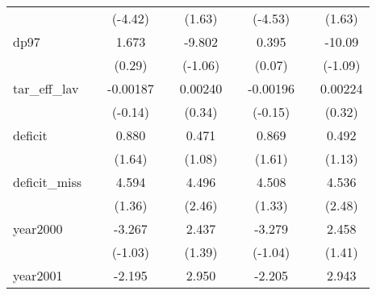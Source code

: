 {\begin{tabular}{l*{8}{c}}
            &                     &     (-4.42)         &                     &      (1.63)         &                     &     (-4.53)         &                     &      (1.63)         \\
[1em]
dp97        &                     &       1.673         &                     &      -9.802         &                     &       0.395         &                     &      -10.09         \\
            &                     &      (0.29)         &                     &     (-1.06)         &                     &      (0.07)         &                     &     (-1.09)         \\
[1em]
tar\_eff\_lav &                     &    -0.00187         &                     &     0.00240         &                     &    -0.00196         &                     &     0.00224         \\
            &                     &     (-0.14)         &                     &      (0.34)         &                     &     (-0.15)         &                     &      (0.32)         \\
[1em]
deficit     &                     &       0.880         &                     &       0.471         &                     &       0.869         &                     &       0.492         \\
            &                     &      (1.64)         &                     &      (1.08)         &                     &      (1.61)         &                     &      (1.13)         \\
[1em]
deficit\_miss&                     &       4.594         &                     &       4.496\sym{*}  &                     &       4.508         &                     &       4.536\sym{*}  \\
            &                     &      (1.36)         &                     &      (2.46)         &                     &      (1.33)         &                     &      (2.48)         \\
[1em]
year2000    &                     &      -3.267         &                     &       2.437         &                     &      -3.279         &                     &       2.458         \\
            &                     &     (-1.03)         &                     &      (1.39)         &                     &     (-1.04)         &                     &      (1.41)         \\
[1em]
year2001    &                     &      -2.195         &                     &       2.950         &                     &      -2.205         &                     &       2.943         \\

\end{tabular}}
